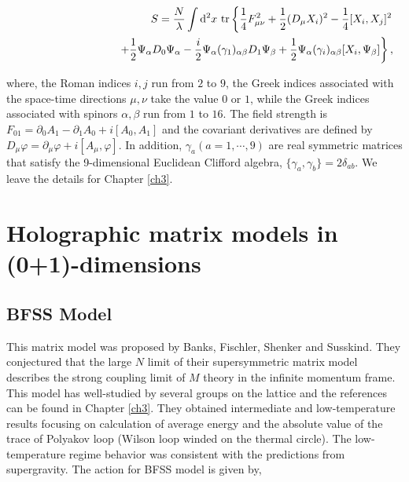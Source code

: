 \begin{eqnarray}
&& 
       S=\frac{N}{\lambda}\int{}{\rm d}^2x\ {\rm tr} 
             \left\{ \frac{1}{4}F^2_{\mu\nu} 
                    + \frac{1}{2}(D_\mu X_i)^2 - \frac{1}{4}[X_i,X_j]^2  
             \right.  \nonumber \\
&& 
      \hspace{3cm} \left.
          +\frac{1}{2} \Psi_\alpha  D_0 \Psi_\alpha 
          -\frac{i}{2} \Psi_\alpha (\gamma_{1})_{\alpha \beta} D_1 \Psi_\beta 
        + \frac{1}{2}\Psi_\alpha (\gamma_i)_{\alpha \beta} [X_i, \Psi_\beta] \right\},
        \label{cont_action}
\end{eqnarray}

where, the Roman indices $i,j$ run from $2$ to $9$, 
the Greek indices associated with the space-time directions $\mu,\nu$ take the value $0$ or $1$,
while the Greek indices associated with spinors $\alpha, \beta$ run from $1$ to $16$. 
The field strength is $F_{01} = \partial_0 A_1 - \partial_1 A_0 +i[A_0,A_1]$ and the covariant derivatives are 
defined by $D_\mu \varphi = \partial_\mu \varphi + i[A_\mu, \varphi]$.  
In addition, $\gamma_a(a=1,\cdots,9)$ are real symmetric matrices that satisfy the 9-dimensional Euclidean Clifford algebra,
$\{\gamma_a,\gamma_b\}=2\delta_{ab}$. We leave the details for Chapter \ref{ch3}. 



\section{Holographic matrix models in (0+1)-dimensions} 
  


\subsection{BFSS Model}

This matrix model was proposed by Banks, Fischler, Shenker and Susskind. They conjectured that the large $N$ limit of their 
supersymmetric matrix model describes the strong coupling limit of $M$ theory in the infinite momentum frame. 
This model has well-studied by several groups on the lattice and the references can be 
found in Chapter \ref{ch3}. They obtained intermediate and low-temperature results focusing on calculation of average 
energy and the absolute value of the trace of Polyakov loop (Wilson loop winded on the thermal circle). 
The low-temperature regime behavior was consistent with the predictions from supergravity. 
The action for BFSS model is given by, 


